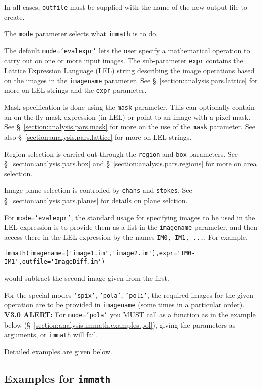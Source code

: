 In all cases, {\tt outfile} must be supplied with the name of the
new output file to create.

The {\tt mode} parameter selects what {\tt immath} is to do.

The default {\tt mode='evalexpr'} lets the user specify a mathematical
operation to carry out on one or more input images.
The sub-parameter {\tt expr} contains the Lattice Expression Language
(LEL) string describing the image operations based on the images
in the {\tt imagename} parameter.
See \S~\ref{section:analysis.pars.lattice} for more on LEL strings
and the {\tt expr} parameter.

Mask specification is done using the {\tt mask} parameter.
This can optionally contain an on-the-fly
mask expression (in LEL) or point to an image with a pixel mask.
See \S~\ref{section:analysis.pars.mask} for more on the use of
the {\tt mask} parameter.  
See also \S~\ref{section:analysis.pars.lattice} for more on LEL strings.

Region selection is carried out through the {\tt region} and {\tt box}
parameters.
See \S~\ref{section:analysis.pars.box} and
\S~\ref{section:analysis.pars.regions} for more on area
selection.

Image plane selection is controlled by {\tt chans} and {\tt stokes}.
See \S~\ref{section:analysis.pars.planes} for details on plane
selction.

For {\tt mode='evalexpr'}, the standard usage for specifying images to
be used in the LEL expression is to provide them as a list in the {\tt imagename}
parameter, and then access there in the LEL expression by the
names {\tt IM0, IM1, ...}.  For example,
\small
\begin{verbatim}
immath(imagename=['image1.im','image2.im'],expr='IM0-IM1',outfile='ImageDiff.im')
\end{verbatim}
\normalsize
would subtract the second image given from the first.

For the special modes {\tt 'spix'}, {\tt 'pola'}, {\tt 'poli'}, the
required images for the given operation are to be provided in 
{\tt imagename} (some times in a particular order). 
{\bf V3.0 ALERT:} For {\tt mode='pola'} you MUST call as a function as
in the example below (\S~\ref{section:analysis.immath.examples.pol}), 
giving the parameters as arguments, or {\tt immath} will fail.

Detailed examples are given below.

\subsection{Examples for {\tt immath}}
\label{section:analysis.immath.examples}

